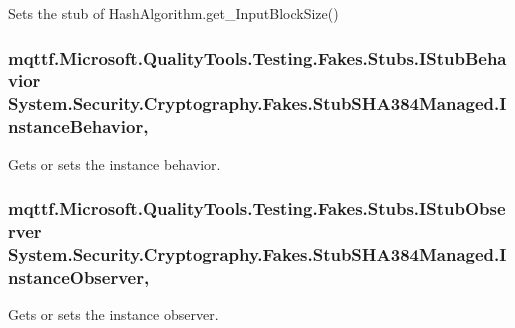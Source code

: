 Sets the stub of Hash\-Algorithm.\-get\-\_\-\-Input\-Block\-Size()

\hypertarget{class_system_1_1_security_1_1_cryptography_1_1_fakes_1_1_stub_s_h_a384_managed_a583b0152f84550c3fab006897cfcd73b}{
\subsubsection[{Instance\-Behavior}]{\setlength{\rightskip}{0pt plus 5cm}mqttf.\-Microsoft.\-Quality\-Tools.\-Testing.\-Fakes.\-Stubs.\-I\-Stub\-Behavior System.\-Security.\-Cryptography.\-Fakes.\-Stub\-S\-H\-A384\-Managed.\-Instance\-Behavior\hspace{0.3cm}{\ttfamily [get]}, {\ttfamily [set]}}}\label{class_system_1_1_security_1_1_cryptography_1_1_fakes_1_1_stub_s_h_a384_managed_a583b0152f84550c3fab006897cfcd73b}


Gets or sets the instance behavior.

\hypertarget{class_system_1_1_security_1_1_cryptography_1_1_fakes_1_1_stub_s_h_a384_managed_a6ab8538ef0a80e20beab33603e18b2f8}{
\subsubsection[{Instance\-Observer}]{\setlength{\rightskip}{0pt plus 5cm}mqttf.\-Microsoft.\-Quality\-Tools.\-Testing.\-Fakes.\-Stubs.\-I\-Stub\-Observer System.\-Security.\-Cryptography.\-Fakes.\-Stub\-S\-H\-A384\-Managed.\-Instance\-Observer\hspace{0.3cm}{\ttfamily [get]}, {\ttfamily [set]}}}\label{class_system_1_1_security_1_1_cryptography_1_1_fakes_1_1_stub_s_h_a384_managed_a6ab8538ef0a80e20beab33603e18b2f8}


Gets or sets the instance observer.

